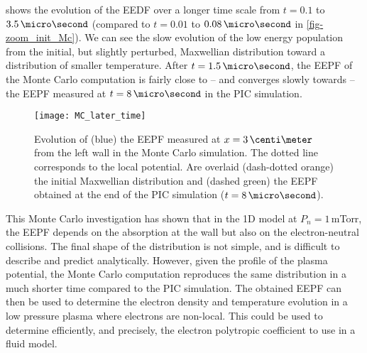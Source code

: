      shows the evolution of the EEDF over a longer time scale from $t=0.1$ to $3.5\,\micro\second$ (compared to $t=0.01$ to $0.08\,\micro\second$ in \cref{fig-zoom_init_Mc}).
    We can see the slow evolution of the low energy population from the initial, but slightly perturbed, Maxwellian distribution toward a distribution of smaller temperature.
    After $t=1.5\,\micro\second$, the EEPF of the Monte Carlo computation is fairly close to -- and converges slowly towards -- the EEPF measured at $t=8\,\micro\second$ in the \ac{PIC} simulation.

    \begin{figure}[!hbt]
      \texttt{[image: MC\_later\_time]}

      \caption{Evolution of (blue) the EEPF measured at $x=3\,\centi\meter$ from the left wall in the Monte Carlo simulation. The dotted line corresponds to the local potential. Are overlaid (dash-dotted orange) the initial Maxwellian distribution and (dashed green) the EEPF obtained at the end of the \acs{PIC} simulation ($t=8\,\micro\second$). }
      \label{fig-zoom_Mc_later}
    \end{figure}

    \vspace{1em}
    This Monte Carlo investigation has shown that in the \ac{1D} model at $P_n=1$\,mTorr, the EEPF depends on the absorption at the wall but also on the electron-neutral collisions.
    The final shape of the distribution is not simple, and is difficult to describe and predict analytically.
    However, given the profile of the plasma potential, the Monte Carlo computation reproduces the same distribution in a much shorter time compared to the \ac{PIC} simulation. 
    The obtained EEPF can then be used to determine the electron density and temperature evolution in a low pressure plasma where electrons are non-local.
    This could be used to determine efficiently, and precisely, the electron polytropic coefficient to use in a fluid model.


